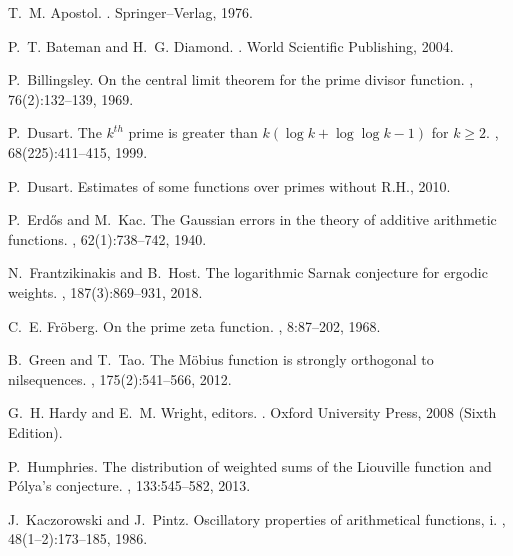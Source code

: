 \documentclass[11pt,reqno,a4letter]{article}
\numberwithin{equation}{section}
\numberwithin{figure}{section}
\numberwithin{table}{section}
\theoremstyle{plain}
\numberwithin{theorem}{section}
\theoremstyle{definition}
\begin{document}
\renewcommand{\refname}{References} 


\begin{thebibliography}{10}

T.~M. Apostol.
.
\newblock Springer--Verlag, 1976.

P.~T. Bateman and H.~G. Diamond.
.
\newblock World Scientific Publishing, 2004.

P.~Billingsley.
\newblock On the central limit theorem for the prime divisor function.
, 76(2):132--139, 1969.

P.~Dusart.
\newblock The $k^{th}$ prime is greater than $k(\log k +\log\log k-1)$ for $k
  \geq 2$.
, 68(225):411--415, 1999.

P.~Dusart.
\newblock Estimates of some functions over primes without {R}.{H}., 2010.

P.~Erd{\H{o}}s and M.~Kac.
\newblock The {G}aussian errors in the theory of additive arithmetic functions.
, 62(1):738--742, 1940.

N.~Frantzikinakis and B.~Host.
\newblock The logarithmic {S}arnak conjecture for ergodic weights.
, 187(3):869--931, 2018.

C.~E. Fr{\"{o}}berg.
\newblock On the prime zeta function.
, 8:87--202, 1968.

B.~Green and T.~Tao.
\newblock The {M}\"{o}bius function is strongly orthogonal to nilsequences.
, 175(2):541--566, 2012.

G.~H. Hardy and E.~M. Wright, editors.
.
\newblock Oxford University Press, 2008 (Sixth Edition).

P.~Humphries.
\newblock The distribution of weighted sums of the {L}iouville function and
  {P}\'{o}lya's conjecture.
, 133:545--582, 2013.

J.~Kaczorowski and J.~Pintz.
\newblock Oscillatory properties of arithmetical functions, i.
, 48(1--2):173--185, 1986.


\end{thebibliography}
\end{document}
